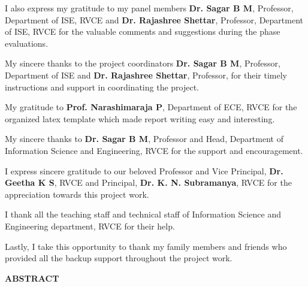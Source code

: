 \documentclass[12pt,a4paper,oneside]{report}
\begin{document}
\noindent I also express my gratitude to my panel members \textbf{Dr. Sagar B M}, Professor, Department of ISE, RVCE and \textbf{Dr. Rajashree Shettar}, Professor, Department of ISE, RVCE for the valuable comments and suggestions during the phase evaluations.
\vspace{0.15in}

\noindent My sincere thanks to the project coordinators \textbf{Dr. Sagar B M}, Professor, Department of ISE and \textbf{Dr. Rajashree Shettar}, Professor, for their timely instructions and support in coordinating the project.
\vspace{0.15in}

\noindent My gratitude to \textbf{Prof. Narashimaraja P}, Department of ECE, RVCE for the organized latex template which made report writing easy and interesting.
\vspace{0.15in}

\noindent My sincere thanks to \textbf{Dr. Sagar B M}, Professor and Head, Department of Information Science and Engineering, RVCE for the support and encouragement.
\vspace{0.15in}

\noindent I express sincere gratitude to our beloved Professor and Vice Principal, \textbf{Dr. Geetha K S}, RVCE and Principal, \textbf{Dr. K. N. Subramanya}, RVCE for the appreciation towards this project work.
\vspace{0.15in}

\noindent I thank all the teaching staff and technical staff of Information Science and Engineering department, RVCE for their help.
\vspace{0.15in}

\noindent Lastly, I take this opportunity to thank my family members and friends who provided all the backup support throughout the project work.
\newpage

\setcounter{page}{1}
\vspace*{0.5cm}

\begin{center}\Huge\textbf{ABSTRACT}\end{center}
\vspace{0.2in}
\end{document}

